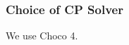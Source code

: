 \documentclass{mpaper}
\begin{document}
\subsubsection{Choice of CP Solver}
We use Choco 4.







\end{document}
